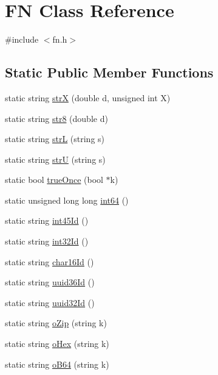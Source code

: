 \hypertarget{class_k_1_1_f_n}{}\section{FN Class Reference}
\label{class_k_1_1_f_n}


{\ttfamily \#include $<$fn.\+h$>$}

\subsection*{Static Public Member Functions}
\begin{DoxyCompactItemize}
\item 
static string \hyperlink{class_k_1_1_f_n_a1b6d5774c1eeed7eff76ede3a7bbd13a}{strX} (double d, unsigned int X)
\item 
static string \hyperlink{class_k_1_1_f_n_ae63dba2964cf9ff6d985f498dd9d0e57}{str8} (double d)
\item 
static string \hyperlink{class_k_1_1_f_n_a460668948200f2d6f51f78ea5673c3c9}{strL} (string s)
\item 
static string \hyperlink{class_k_1_1_f_n_a7f5fedf629fc35cbc6e06fa8a82827f2}{strU} (string s)
\item 
static bool \hyperlink{class_k_1_1_f_n_ab7a5b67f0e6ddd1e760401469c7d4990}{true\+Once} (bool $\ast$k)
\item 
static unsigned long long \hyperlink{class_k_1_1_f_n_a0e202b7fc871ab32aa9a786c26f9cee6}{int64} ()
\item 
static string \hyperlink{class_k_1_1_f_n_aac21ced5ebe5b0212be0da3dffbfb043}{int45\+Id} ()
\item 
static string \hyperlink{class_k_1_1_f_n_a10dcefb4f25405633cffdb33e4da258f}{int32\+Id} ()
\item 
static string \hyperlink{class_k_1_1_f_n_a1cfe809d6b44a9393408bcb1f8c9b53a}{char16\+Id} ()
\item 
static string \hyperlink{class_k_1_1_f_n_a714d7fe61d0f6e7f3621da6ddd3a6c5b}{uuid36\+Id} ()
\item 
static string \hyperlink{class_k_1_1_f_n_af6ef395dc8c8e8068f14451885c134ed}{uuid32\+Id} ()
\item 
static string \hyperlink{class_k_1_1_f_n_af003c81215a8d604e11f13d9082c9dc7}{o\+Zip} (string k)
\item 
static string \hyperlink{class_k_1_1_f_n_a636ddfc4dd5ea2469428d24ff73f4eb7}{o\+Hex} (string k)
\item 
static string \hyperlink{class_k_1_1_f_n_aa6f11ec4cc9fb2c8081554136e6fb4c3}{o\+B64} (string k)

\end{DoxyCompactItemize}
